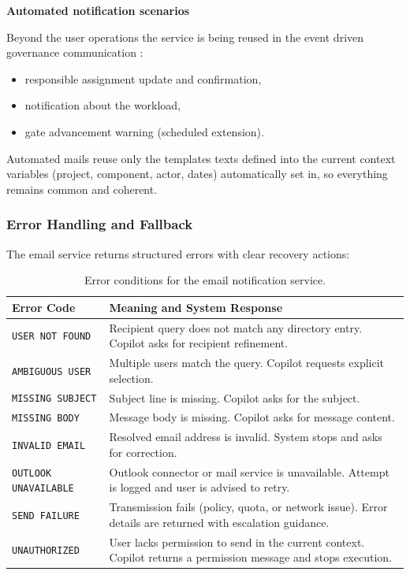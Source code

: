 \noindent \textbf{Automated notification scenarios}

Beyond the user operations the service is being reused in the event driven governance communication :

\begin{itemize}
    \item[\quad\textbullet] responsible assignment update and confirmation,
    \item[\quad\textbullet] notification about the workload,
    \item[\quad\textbullet] gate advancement warning (scheduled extension).
\end{itemize}

\noindent Automated mails reuse only the templates texts defined into the current context variables (project, component, actor, dates) automatically set in, so everything remains common and coherent.

\subsubsection{\textcolor[HTML]{0066CC}{Error Handling and Fallback}}

The email service returns structured errors with clear recovery actions:

\begin{table}[H]
\centering
\small
\caption{Error conditions for the email notification service.}
\label{tab:email-service-errors}
\begin{tabularx}{0.95\textwidth}{|l|X|}
    \hline
    \rowcolor[HTML]{E6F2FF}\textcolor[HTML]{003D99}{\textbf{Error Code}} & \textcolor[HTML]{003D99}{\textbf{Meaning and System Response}} \\
    \hline
    \texttt{USER NOT FOUND} & Recipient query does not match any directory entry. Copilot asks for recipient refinement. \\
    \hline
    \texttt{AMBIGUOUS USER} & Multiple users match the query. Copilot requests explicit selection. \\
    \hline
    \texttt{MISSING SUBJECT} & Subject line is missing. Copilot asks for the subject. \\
    \hline
    \texttt{MISSING BODY} & Message body is missing. Copilot asks for message content. \\
    \hline
    \texttt{INVALID EMAIL} & Resolved email address is invalid. System stops and asks for correction. \\
    \hline
    \texttt{OUTLOOK UNAVAILABLE} & Outlook connector or mail service is unavailable. Attempt is logged and user is advised to retry. \\
    \hline
    \texttt{SEND FAILURE} & Transmission fails (policy, quota, or network issue). Error details are returned with escalation guidance. \\
    \hline
    \texttt{UNAUTHORIZED} & User lacks permission to send in the current context. Copilot returns a permission message and stops execution. \\
    \hline
\end{tabularx}
\end{table}

